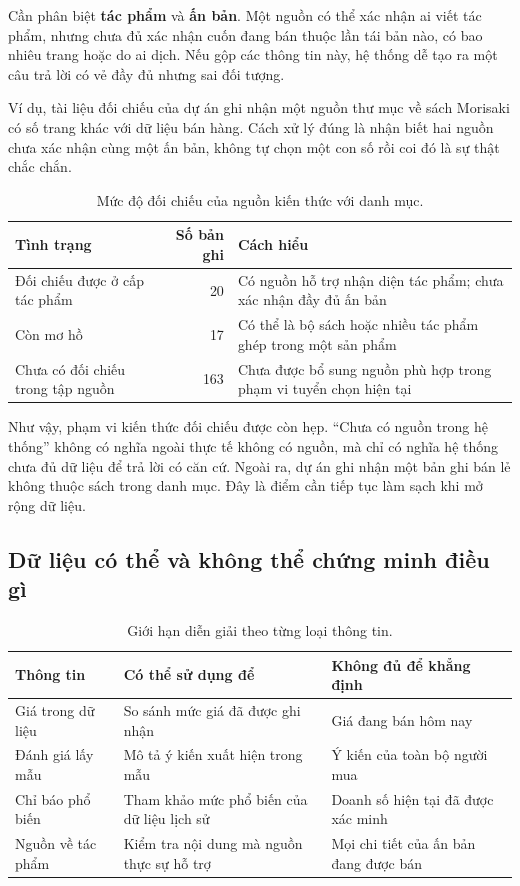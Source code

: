 Cần phân biệt \textbf{tác phẩm} và \textbf{ấn bản}. Một nguồn có thể xác nhận ai viết tác phẩm, nhưng chưa đủ xác nhận cuốn đang bán thuộc lần tái bản nào, có bao nhiêu trang hoặc do ai dịch. Nếu gộp các thông tin này, hệ thống dễ tạo ra một câu trả lời có vẻ đầy đủ nhưng sai đối tượng.

Ví dụ, tài liệu đối chiếu của dự án ghi nhận một nguồn thư mục về sách Morisaki có số trang khác với dữ liệu bán hàng. Cách xử lý đúng là nhận biết hai nguồn chưa xác nhận cùng một ấn bản, không tự chọn một con số rồi coi đó là sự thật chắc chắn. 

\begin{table}[htbp]\small
\caption{Mức độ đối chiếu của nguồn kiến thức với danh mục.}
\begin{tabularx}{\linewidth}{YrY}\toprule
Tình trạng & Số bản ghi & Cách hiểu\\\midrule
Đối chiếu được ở cấp tác phẩm & 20 & Có nguồn hỗ trợ nhận diện tác phẩm; chưa xác nhận đầy đủ ấn bản\\
Còn mơ hồ & 17 & Có thể là bộ sách hoặc nhiều tác phẩm ghép trong một sản phẩm\\
Chưa có đối chiếu trong tập nguồn & 163 & Chưa được bổ sung nguồn phù hợp trong phạm vi tuyển chọn hiện tại\\\bottomrule
\end{tabularx}
\end{table}

Như vậy, phạm vi kiến thức đối chiếu được còn hẹp. ``Chưa có nguồn trong hệ thống'' không có nghĩa ngoài thực tế không có nguồn, mà chỉ có nghĩa hệ thống chưa đủ dữ liệu để trả lời có căn cứ. Ngoài ra, dự án ghi nhận một bản ghi bán lẻ không thuộc sách trong danh mục. Đây là điểm cần tiếp tục làm sạch khi mở rộng dữ liệu. 

\subsection{Dữ liệu có thể và không thể chứng minh điều gì}
\begin{table}[htbp]\small
\caption{Giới hạn diễn giải theo từng loại thông tin.}
\begin{tabularx}{\linewidth}{P{33mm}YY}\toprule
Thông tin & Có thể sử dụng để & Không đủ để khẳng định\\\midrule
Giá trong dữ liệu & So sánh mức giá đã được ghi nhận & Giá đang bán hôm nay\\
Đánh giá lấy mẫu & Mô tả ý kiến xuất hiện trong mẫu & Ý kiến của toàn bộ người mua\\
Chỉ báo phổ biến & Tham khảo mức phổ biến của dữ liệu lịch sử & Doanh số hiện tại đã được xác minh\\
Nguồn về tác phẩm & Kiểm tra nội dung mà nguồn thực sự hỗ trợ & Mọi chi tiết của ấn bản đang được bán\\\bottomrule
\end{tabularx}
\end{table}

